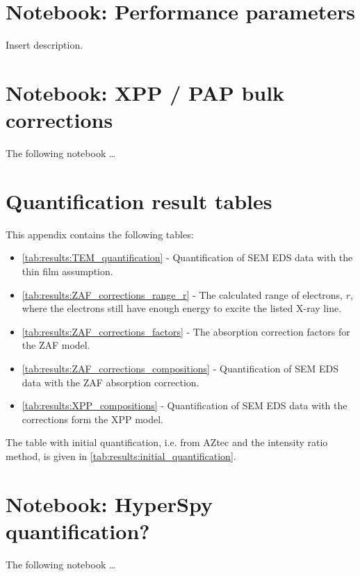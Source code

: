 



\chapter{Notebook: Performance parameters}
\label{appendix:performance}

Insert description.


\chapter{Notebook: XPP / PAP bulk corrections}
\label{appendix:xpp}

The following notebook \dots
% 



\chapter{Quantification result tables}
\label{appendix:tables}

This appendix contains the following tables:

\begin{itemize}
    \item \cref{tab:results:TEM_quantification} - Quantification of SEM EDS data with the thin film assumption.
    \item \cref{tab:results:ZAF_corrections_range_r} - The calculated range of electrons, $r$, where the electrons still have enough energy to excite the listed X-ray line.
    \item \cref{tab:results:ZAF_corrections_factors} - The absorption correction factors for the ZAF model.
    \item \cref{tab:results:ZAF_corrections_compositions} - Quantification of SEM EDS data with the ZAF absorption correction.
    \item \cref{tab:results:XPP_compositions} - Quantification of SEM EDS data with the corrections form the XPP model.    
\end{itemize}

The table with initial quantification, i.e. from AZtec and the intensity ratio method, is given in \cref{tab:results:initial_quantification}.








\chapter{Notebook: HyperSpy quantification?}
\label{appendix:HSquant}

The following notebook \dots
% 